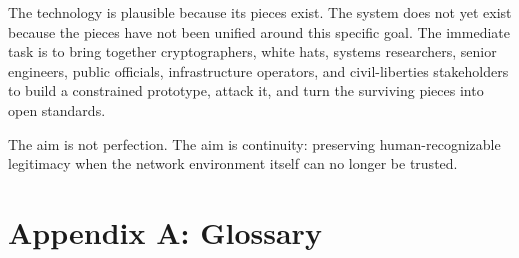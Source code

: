 \documentclass[11pt,letterpaper]{article}
\begin{document}
The technology is plausible because its pieces exist. The system does not yet exist because the pieces have not been unified around this specific goal. The immediate task is to bring together cryptographers, white hats, systems researchers, senior engineers, public officials, infrastructure operators, and civil-liberties stakeholders to build a constrained prototype, attack it, and turn the surviving pieces into open standards.

The aim is not perfection. The aim is continuity: preserving human-recognizable legitimacy when the network environment itself can no longer be trusted.

\newpage
\appendix

\section{Appendix A: Glossary}
\end{document}
